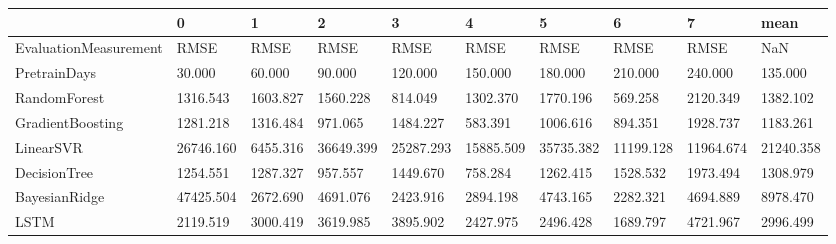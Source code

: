 \begin{tabular}{llllllllll}
\toprule
{} &         0 &        1 &         2 &         3 &         4 &         5 &         6 &         7 &      mean \\
\midrule
EvaluationMeasurement &      RMSE &     RMSE &      RMSE &      RMSE &      RMSE &      RMSE &      RMSE &      RMSE &       NaN \\
PretrainDays          &    30.000 &   60.000 &    90.000 &   120.000 &   150.000 &   180.000 &   210.000 &   240.000 &   135.000 \\
RandomForest          &  1316.543 & 1603.827 &  1560.228 &   814.049 &  1302.370 &  1770.196 &   569.258 &  2120.349 &  1382.102 \\
GradientBoosting      &  1281.218 & 1316.484 &   971.065 &  1484.227 &   583.391 &  1006.616 &   894.351 &  1928.737 &  1183.261 \\
LinearSVR             & 26746.160 & 6455.316 & 36649.399 & 25287.293 & 15885.509 & 35735.382 & 11199.128 & 11964.674 & 21240.358 \\
DecisionTree          &  1254.551 & 1287.327 &   957.557 &  1449.670 &   758.284 &  1262.415 &  1528.532 &  1973.494 &  1308.979 \\
BayesianRidge         & 47425.504 & 2672.690 &  4691.076 &  2423.916 &  2894.198 &  4743.165 &  2282.321 &  4694.889 &  8978.470 \\
LSTM                  &  2119.519 & 3000.419 &  3619.985 &  3895.902 &  2427.975 &  2496.428 &  1689.797 &  4721.967 &  2996.499 \\
\bottomrule
\end{tabular}
